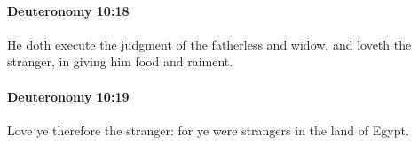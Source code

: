 		\paragraph{Deuteronomy 10:18} %
			\label{DEUTERONOMY-10-18}

			He doth execute the judgment of the fatherless and widow, and loveth the stranger, in giving him food and raiment.


		\paragraph{Deuteronomy 10:19} %
			\label{DEUTERONOMY-10-19}

			Love ye therefore the stranger: for ye were strangers in the land of Egypt.


